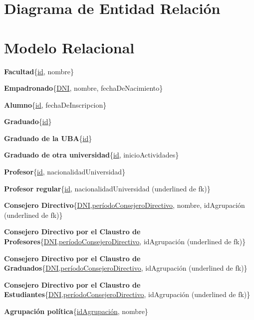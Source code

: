 \documentclass[a4paper, 10pt, twoside]{article}
\begin{document}
\newpage




\section{Diagrama de Entidad Relación}

\section{Modelo Relacional}

\textbf{Facultad}\{\underline{id}, nombre\}

\textbf{Empadronado}\{\underline{DNI}, nombre, fechaDeNacimiento\}

\textbf{Alumno}\{\underline{\underline{id}}, fechaDeInscripcion\}

\textbf{Graduado}\{\underline{\underline{id}}\}

\textbf{Graduado de la UBA}\{\underline{\underline{id}}\}

\textbf{Graduado de otra universidad}\{\underline{\underline{id}}, inicioActividades\}

\textbf{Profesor}\{\underline{\underline{id}}, nacionalidadUniversidad\}

\textbf{Profesor regular}\{\underline{\underline{id}}, nacionalidadUniversidad (underlined de fk)\}

\textbf{Consejero Directivo}\{\underline{\underline{DNI}},\underline{períodoConsejeroDirectivo}, nombre, idAgrupación (underlined de fk)\}

\textbf{Consejero Directivo por el Claustro de Profesores}\{\underline{\underline{DNI}},\underline{\underline{períodoConsejeroDirectivo}}, idAgrupación (underlined de fk)\}

\textbf{Consejero Directivo por el Claustro de Graduados}\{\underline{\underline{DNI}},\underline{\underline{períodoConsejeroDirectivo}}, idAgrupación (underlined de fk)\}

\textbf{Consejero Directivo por el Claustro de Estudiantes}\{\underline{\underline{DNI}},\underline{\underline{períodoConsejeroDirectivo}}, idAgrupación (underlined de fk)\}

\textbf{Agrupación política}\{\underline{idAgrupación}, nombre\}
\end{document}
